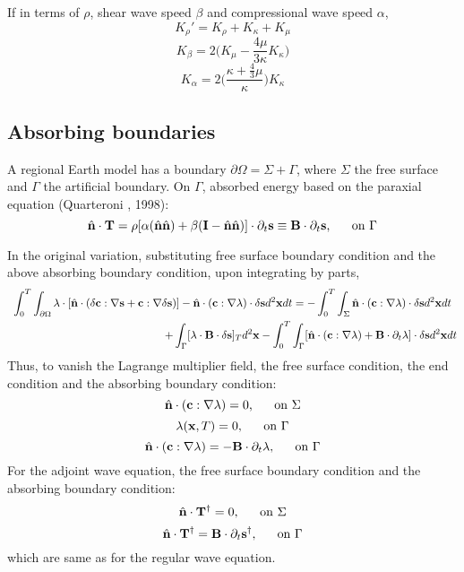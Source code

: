 If in terms of $\rho$, shear wave speed $\beta$ and compressional wave speed $\alpha$,
\[ K_\rho'=K_\rho+K_\kappa+K_\mu \]
\[ K_\beta=2\Big(K_\mu-\frac{4\mu}{3\kappa}K_\kappa\Big) \]
\[ K_\alpha=2\bigg(\frac{\kappa+\frac{4}{3}\mu}{\kappa}\bigg)K_\kappa \]

\subsection{Absorbing boundaries}
A regional Earth model has a boundary $\partial\Omega=\Sigma+\Gamma$,
where $\Sigma$ the free surface and $\Gamma$ the artificial boundary.
On $\Gamma$, absorbed energy based on the paraxial equation (Quarteroni \etal, 1998):
\[ \hat{\mathbf{n}}\cdot\mathbf{T}=\rho[\alpha(\hat{\mathbf{n}}\hat{\mathbf{n}})+\beta(\mathbf{I}-\hat{\mathbf{n}}\hat{\mathbf{n}})]\cdot\partial_t\mathbf{s}\equiv\mathbf{B}\cdot\partial_t\mathbf{s} \text{,\hspace{5mm} on } \Gamma \]

In the original variation, substituting free surface boundary condition
and the above absorbing boundary condition, upon integrating by parts,
\begin{gather*}
  \int_0^T\int_{\partial\Omega}\lambda\cdot[\hat{\mbf n}\cdot(\delta\mbf c:\nabla\mbf s+\mbf c:\nabla\delta\mbf s)]-\hat{\mbf n}\cdot(\mbf c:\nabla\lambda)\cdot\delta\mbf sd^2\mbf xdt=-\int_0^T\int_\Sigma\hat{\mbf n}\cdot(\mbf c:\nabla\lambda)\cdot\delta\mbf sd^2\mbf xdt \\
  \hspace{50mm} +\int_\Gamma[\lambda\cdot\mbf B\cdot\delta\mbf s]_Td^2\mbf x-\int_0^T\int_\Gamma[\hat{\mbf n}\cdot(\mbf c:\nabla\lambda)+\mbf B\cdot\partial_t\lambda]\cdot\delta\mbf sd^2\mbf xdt
\end{gather*}
Thus, to vanish the Lagrange multiplier field, the free surface condition,
the end condition and the absorbing boundary condition:
\[ \hat{\mathbf{n}}\cdot(\mathbf{c}:\nabla\lambda)=0 \text{,\hspace{5mm} on } \Sigma \]
\[ \lambda(\mathbf{x},T)=0 \text{,\hspace{5mm} on } \Gamma \]
\[ \hat{\mathbf{n}}\cdot(\mathbf{c}:\nabla\lambda)=-\mathbf{B}\cdot\partial_t\lambda \text{,\hspace{5mm} on } \Gamma \]
For the adjoint wave equation, the free surface boundary condition
and the absorbing boundary condition:
\[ \hat{\mathbf{n}}\cdot\mathbf{T}^\dagger=0 \text{,\hspace{5mm} on } \Sigma \]
\[ \hat{\mathbf{n}}\cdot\mathbf{T}^\dagger=\mathbf{B}\cdot\partial_t\mathbf{s}^\dagger \text{,\hspace{5mm} on } \Gamma \]
which are same as for the regular wave equation.

